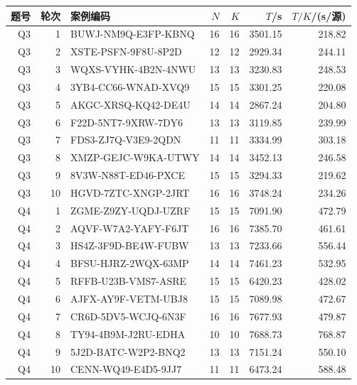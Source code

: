 \begin{tabular}{rrlrrrr}
\toprule
题号 & 轮次 & 案例编码 & $N$ & $K$ & $T$/s & $T/K$/(s/源) \\
\midrule
Q3 & 1 & BUWJ-NM9Q-E3FP-KBNQ & 16 & 16 & 3501.15 & 218.82 \\
Q3 & 2 & XSTE-PSFN-9F8U-8P2D & 12 & 12 & 2929.34 & 244.11 \\
Q3 & 3 & WQXS-VYHK-4B2N-4NWU & 13 & 13 & 3230.83 & 248.53 \\
Q3 & 4 & 3YB4-CC66-WNAD-XVQ9 & 15 & 15 & 3301.25 & 220.08 \\
Q3 & 5 & AKGC-XRSQ-KQ42-DE4U & 14 & 14 & 2867.24 & 204.80 \\
Q3 & 6 & F22D-5NT7-9XRW-7DY6 & 13 & 13 & 3119.85 & 239.99 \\
Q3 & 7 & FDS3-ZJ7Q-V3E9-2QDN & 11 & 11 & 3334.99 & 303.18 \\
Q3 & 8 & XMZP-GEJC-W9KA-UTWY & 14 & 14 & 3452.13 & 246.58 \\
Q3 & 9 & 8V3W-N88T-ED46-PXCE & 15 & 15 & 3294.33 & 219.62 \\
Q3 & 10 & HGVD-7ZTC-XNGP-2JRT & 16 & 16 & 3748.24 & 234.26 \\
Q4 & 1 & ZGME-Z9ZY-UQDJ-UZRF & 15 & 15 & 7091.90 & 472.79 \\
Q4 & 2 & AQVF-W7A2-YAFY-F6JT & 16 & 16 & 7385.70 & 461.61 \\
Q4 & 3 & HS4Z-3F9D-BE4W-FUBW & 13 & 13 & 7233.66 & 556.44 \\
Q4 & 4 & BFSU-HJRZ-2WQX-63MP & 14 & 14 & 7461.23 & 532.95 \\
Q4 & 5 & RFFB-U23B-VMS7-ASRE & 15 & 15 & 6420.23 & 428.02 \\
Q4 & 6 & AJFX-AY9F-VETM-UBJ8 & 15 & 15 & 7089.98 & 472.67 \\
Q4 & 7 & CR6D-5DV5-WCJQ-6N3F & 16 & 16 & 7677.93 & 479.87 \\
Q4 & 8 & TY94-4B9M-J2RU-EDHA & 10 & 10 & 7688.73 & 768.87 \\
Q4 & 9 & 5J2D-BATC-W2P2-BNQ2 & 13 & 13 & 7151.24 & 550.10 \\
Q4 & 10 & CENN-WQ49-E4D5-9JJ7 & 11 & 11 & 6473.24 & 588.48 \\
\bottomrule
\end{tabular}
